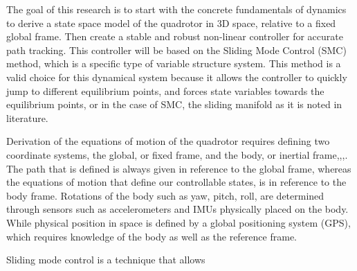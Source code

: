 \documentclass[twocolumn,10pt]{asme2e}
\begin{document}
{The goal of this research is to start with the concrete fundamentals of dynamics to derive a state space model of the quadrotor in 3D space, relative to a fixed global frame. Then create a stable and robust non-linear controller for accurate path tracking. This controller will be based on the Sliding Mode Control (SMC) method, which is a specific type of variable structure system. This method is a valid choice for this dynamical system because it allows the controller to quickly jump to different equilibrium points, and forces state variables towards the equilibrium points, or in the case of SMC, the sliding manifold as it is noted in literature.

Derivation of the equations of motion of the quadrotor requires defining two coordinate systems, the global, or fixed frame, and the body, or inertial frame\cite{FanniMohamed2017AN6Q},\cite{FarameeVeeravat2014EotS},\cite{HaomiaoHuang2009Aaco},\cite{DenisKotarski2016CDFU}. The path that is defined is always given in reference to the global frame, whereas the equations of motion that define our controllable states, is in reference to the body frame. Rotations of the body such as yaw, pitch, roll, are determined through sensors such as accelerometers and IMUs physically placed on the body. While physical position in space is defined by a global positioning system (GPS), which requires knowledge of the body as well as the reference frame.

Sliding mode control is a technique that allows}
\end{document}
